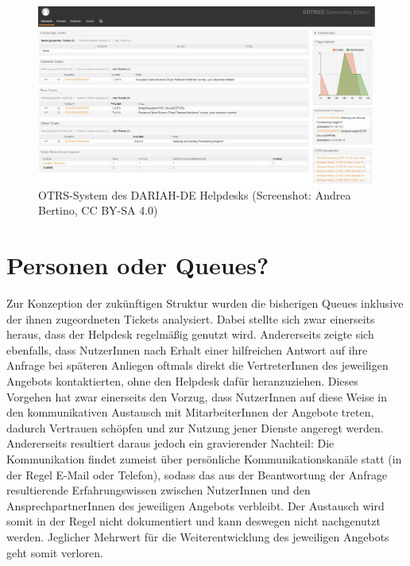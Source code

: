 \documentclass[a4paper,
fontsize=11pt,
oneside,
numbers=noperiodatend,
parskip=half-,
bibliography=totoc,
final
]{scrartcl}
\begin{document}
\begin{figure}
\centering
\includegraphics{img/OTRS.jpg}
\caption{OTRS-System des DARIAH-DE Helpdesks (Screenshot: Andrea
Bertino, CC BY-SA 4.0)}
\end{figure}

\hypertarget{personen-oder-queues}{%
\section{Personen oder Queues?}\label{personen-oder-queues}}

Zur Konzeption der zukünftigen Struktur wurden die bisherigen Queues
inklusive der ihnen zugeordneten Tickets analysiert. Dabei stellte sich
zwar einerseits heraus, dass der Helpdesk regelmäßig genutzt wird.
Andererseits zeigte sich ebenfalls, dass NutzerInnen nach Erhalt einer
hilfreichen Antwort auf ihre Anfrage bei späteren Anliegen oftmals
direkt die VertreterInnen des jeweiligen Angebots kontaktierten, ohne
den Helpdesk dafür heranzuziehen. Dieses Vorgehen hat zwar einerseits
den Vorzug, dass NutzerInnen auf diese Weise in den kommunikativen
Austausch mit MitarbeiterInnen der Angebote treten, dadurch Vertrauen
schöpfen und zur Nutzung jener Dienste angeregt werden. Andererseits
resultiert daraus jedoch ein gravierender Nachteil: Die Kommunikation
findet zumeist über persönliche Kommunikationskanäle statt (in der Regel
E-Mail oder Telefon), sodass das aus der Beantwortung der Anfrage
resultierende Erfahrungswissen zwischen NutzerInnen und den
AnsprechpartnerInnen des jeweiligen Angebots verbleibt. Der Austausch
wird somit in der Regel nicht dokumentiert und kann deswegen nicht
nachgenutzt werden. Jeglicher Mehrwert für die Weiterentwicklung des
jeweiligen Angebots geht somit verloren.
\end{document}
